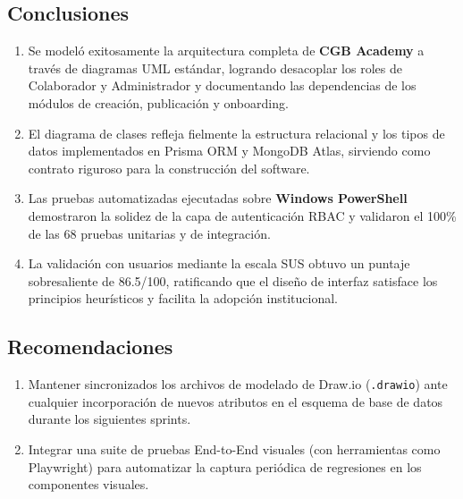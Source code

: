 \documentclass[11pt,a4paper]{article}
\begin{document}
\subsection{Conclusiones}
\begin{enumerate}[leftmargin=*]
    \item Se modeló exitosamente la arquitectura completa de \textbf{CGB Academy} a través de diagramas UML estándar, logrando desacoplar los roles de Colaborador y Administrador y documentando las dependencias de los módulos de creación, publicación y onboarding.
    \item El diagrama de clases refleja fielmente la estructura relacional y los tipos de datos implementados en Prisma ORM y MongoDB Atlas, sirviendo como contrato riguroso para la construcción del software.
    \item Las pruebas automatizadas ejecutadas sobre \textbf{Windows PowerShell} demostraron la solidez de la capa de autenticación RBAC y validaron el 100\% de las 68 pruebas unitarias y de integración.
    \item La validación con usuarios mediante la escala SUS obtuvo un puntaje sobresaliente de 86.5/100, ratificando que el diseño de interfaz satisface los principios heurísticos y facilita la adopción institucional.
\end{enumerate}

\subsection{Recomendaciones}
\begin{enumerate}[leftmargin=*]
    \item Mantener sincronizados los archivos de modelado de Draw.io (\texttt{.drawio}) ante cualquier incorporación de nuevos atributos en el esquema de base de datos durante los siguientes sprints.
    \item Integrar una suite de pruebas End-to-End visuales (con herramientas como Playwright) para automatizar la captura periódica de regresiones en los componentes visuales.
\end{enumerate}
\end{document}
